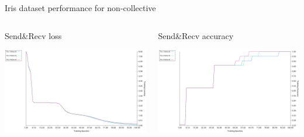 \documentclass[presentation]{beamer}
\begin{document}
\begin{frame}[label={sec:org3f3cba4}]{Iris dataset performance for non-collective}
\begin{columns}
\begin{column}{0.6\columnwidth}
\begin{block}{Send\&Recv loss}
\begin{center}
\includegraphics[width=.9\linewidth]{./png/iris_sendrecv_loss.png}
\end{center}
\end{block}
\end{column}

\begin{column}{0.6\columnwidth}
\begin{block}{Send\&Recv accuracy}
\begin{center}
\includegraphics[width=.9\linewidth]{./png/iris_sendrecv_accuracy.png}
\end{center}
\end{block}
\end{column}
\end{columns}
\end{frame}
\end{document}
